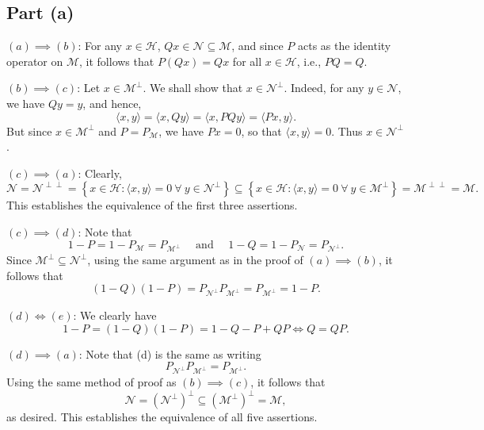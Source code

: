 \documentclass[10pt]{amsart}
\theoremstyle{thmstyle}
\theoremstyle{defstyle}
\newcommand{\calH}{\mathcal{H}} %
\newcommand{\calM}{\mathcal{M}}
\newcommand{\calN}{\mathcal{N}}
\begin{document}
\subsection*{Part (a)} 

$(a)\implies(b)$: For any $x\in\calH$, $Qx\in\calN\subseteq\calM$, and since $P$ acts as the identity operator on $\calM$, it follows that $P(Qx) = Qx$ for all $x\in\calH$, i.e., $PQ = Q$.

$(b)\implies(c)$: Let $x\in\calM^\perp$. We shall show that $x\in\calN^\perp$. Indeed, for any $y\in\calN$, we have $Qy = y$, and hence, 
\begin{equation*}
    \langle x, y\rangle = \langle x, Qy\rangle = \langle x, PQy\rangle = \langle Px, y\rangle.
\end{equation*}
But since $x\in\calM^\perp$ and $P = P_{\calM}$, we have $Px = 0$, so that $\langle x, y\rangle = 0$. Thus $x\in\calN^\perp$.

$(c)\implies(a)$: Clearly, 
\begin{equation*}
    \calN = \calN^{\perp\perp} = \left\{x\in\calH\colon \langle x, y\rangle = 0~\forall~y\in\calN^\perp\right\}\subseteq\left\{x\in\calH\colon \langle x, y\rangle = 0~\forall~y\in\calM^\perp\right\} = \calM^{\perp\perp} = \calM.
\end{equation*}
This establishes the equivalence of the first three assertions.

$(c)\implies(d)$: Note that 
\begin{equation*}
    1 - P = 1 - P_{\calM} = P_{\calM^\perp}\quad\text{ and }\quad 1 - Q = 1 - P_{\calN} = P_{\calN^\perp}.
\end{equation*}
Since $\calM^\perp\subseteq\calN^\perp$, using the same argument as in the proof of $(a)\implies(b)$, it follows that 
\begin{equation*}
    (1 - Q)(1 - P) = P_{\calN^\perp}P_{\calM^\perp} = P_{\calM^\perp} = 1 - P.
\end{equation*}

$(d)\iff(e)$: We clearly have 
\begin{equation*}
    1 - P = (1 - Q)(1 - P) = 1 - Q - P + QP \iff Q = QP.
\end{equation*}

$(d)\implies(a)$: Note that (d) is the same as writing 
\begin{equation*}
    P_{\calN^\perp}P_{\calM^\perp} = P_{\calM^\perp}.
\end{equation*}
Using the same method of proof as $(b)\implies(c)$, it follows that 
\begin{equation*}
    \calN = \left(\calN^\perp\right)^\perp\subseteq\left(\calM^\perp\right)^\perp = \calM,
\end{equation*}
as desired. This establishes the equivalence of all five assertions. 
\end{document}
